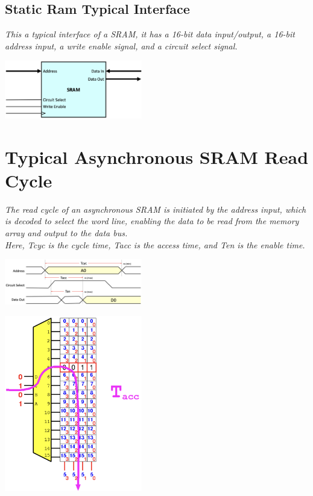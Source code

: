 \subsection{Static Ram Typical Interface}
\textit{This a typical interface of a SRAM, it has a 16-bit data input/output, a 16-bit address input, a write enable signal, and a circuit select signal.}
\begin{center}
    \includegraphics[width=0.45\textwidth]{chapters/chapter1c/images/sram_interface.png}
\end{center}

\section{Typical Asynchronous SRAM Read Cycle}
\textit{The read cycle of an asynchronous SRAM is initiated by the address input, which is decoded to select the word line, enabling the data to be read from the memory array and output to the data bus.} \\ \vspace*{5px}
\textit{Here, Tcyc is the cycle time, Tacc is the access time, and Ten is the enable time.}

\begin{minipage}[htp]{0.45\textwidth}
    \begin{center}
        \includegraphics[width=0.45\textwidth]{chapters/chapter1c/images/sram_read.png}
    \end{center}
\end{minipage}
\hfill
\vline
\hfill
\begin{minipage}[htp]{0.45\textwidth}
    \begin{center}
        \includegraphics[width=0.45\textwidth]{chapters/chapter1c/images/sram_read2.png}
    \end{center}
\end{minipage}  
